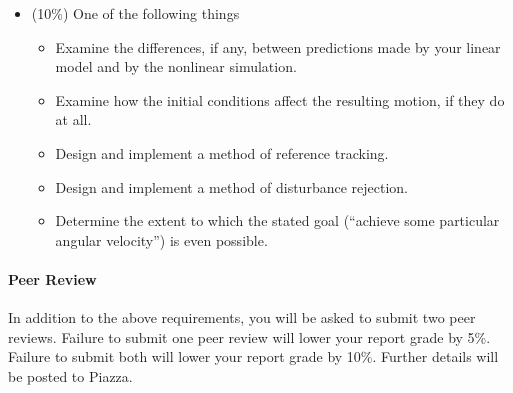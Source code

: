 \documentclass[12pt]{article}
\begin{document}
\begin{itemize}
	\item (10\%) One of the following things
	\begin{itemize}
		\item Examine the differences, if any, between predictions made by your linear model and by the nonlinear simulation.
		\item Examine how the initial conditions affect the resulting motion, if they do at all.
		\item Design and implement a method of reference tracking.
		\item Design and implement a method of disturbance rejection.
		\item Determine the extent to which the stated goal (``achieve some particular angular velocity'') is even possible.
	\end{itemize}
\end{itemize}

\paragraph{Peer Review} \hfill \break
In addition to the above requirements, you will be asked to submit two peer reviews. Failure to submit one peer review will lower your report grade by 5\%. Failure to submit both will lower your report grade by 10\%. Further details will be posted to Piazza.

\end{document}
